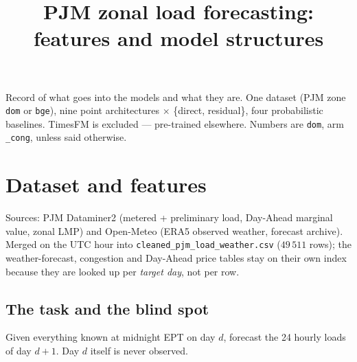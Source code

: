 \documentclass[11pt]{article}
\title{PJM zonal load forecasting: features and model structures}
\author{}
\date{}
\newcommand{\code}[1]{\texttt{\small #1}}
\begin{document}
\maketitle
\vspace{-3em}

\noindent
Record of what goes into the models and what they are. One dataset (PJM zone
\code{dom} or \code{bge}), nine point architectures $\times$ \{direct, residual\},
four probabilistic baselines. TimesFM is excluded --- pre-trained elsewhere.
Numbers are \code{dom}, arm \code{\_cong}, unless said otherwise.

\section{Dataset and features}

\noindent
Sources: PJM Dataminer2 (metered + preliminary load, Day-Ahead marginal value,
zonal LMP) and Open-Meteo (ERA5 observed weather, forecast archive). Merged on
the UTC hour into \code{cleaned\_pjm\_load\_weather.csv} ($49\,511$ rows); the
weather-forecast, congestion and Day-Ahead price tables stay on their own index
because they are looked up per \emph{target day}, not per row.

\subsection{The task and the blind spot}

Given everything known at midnight EPT on day $d$, forecast the 24 hourly loads
of day $d{+}1$. Day $d$ itself is never observed.
\end{document}
